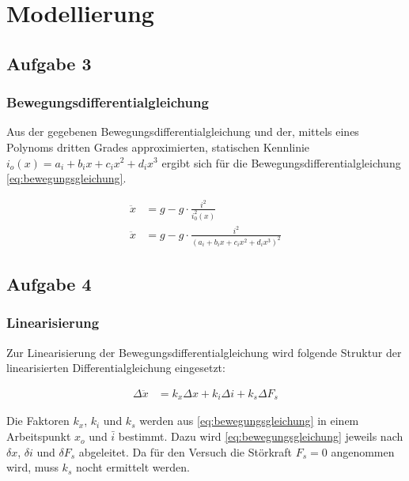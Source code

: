 \newcommand{\laplace}{%
  \tikz[baseline={(base)}, inner sep=0pt, outer sep=0pt]{
    \node[circle, fill, inner sep=1.5pt] (solid) at (0,0) {};
    \node[draw, circle, inner sep=1.5pt] (hollow) at (0,.5) {};
    \draw (solid) -- (hollow);
    \coordinate (base) at (0,0);
  }
}

\chapter{Modellierung}\label{chap:Modellierung}
\section{Aufgabe 3}\label{sec:Aufgabe3}
	\subsection*{Bewegungsdifferentialgleichung}\label{sub:diffeq}
	Aus der gegebenen Bewegungsdifferentialgleichung und der, mittels eines Polynoms dritten Grades approximierten, statischen Kennlinie $i_o(x) = a_i + b_ix +c_ix^2 + d_ix^3$ ergibt sich für die Bewegungsdifferentialgleichung \ref{eq:bewegungsgleichung}. 
	
	\begin{align}\label{eq:bewegungsgleichung}
		\ddot{x} &= g - g \cdot \frac{i^2}{i_0^2(x)} \nonumber\\
		\ddot{x} &= g - g \cdot \frac{i^2}{(a_i + b_ix +c_ix^2 + d_ix^3)^2}
	\end{align} 

\section{Aufgabe 4}\label{sec:Aufgabe4}
	\subsection*{Linearisierung}\label{sub:diffeq_lin}
	Zur Linearisierung der Bewegungsdifferentialgleichung wird folgende Struktur der linearisierten Differentialgleichung eingesetzt:

	\begin{align}\label{eq:lin_eq} 
		\Delta\ddot{x} &= k_x\Delta x + k_i\Delta i + k_s \Delta F_s
	\end{align} 

	Die Faktoren $k_x$, $k_i$ und $k_s$ werden aus \autoref{eq:bewegungsgleichung} in einem Arbeitspunkt $x_o$ und $\bar{i}$ bestimmt. Dazu wird \autoref{eq:bewegungsgleichung} jeweils nach $\delta x$, $\delta i$ und $\delta F_s$ abgeleitet. Da für den Versuch die Störkraft $F_s = 0$ angenommen wird, muss $k_s$ nocht ermittelt werden. 


